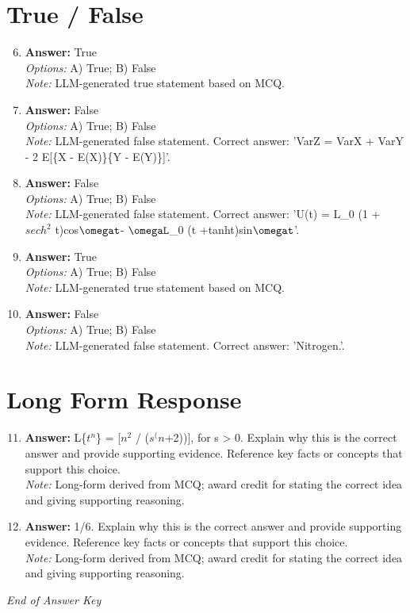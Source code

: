 \documentclass[12pt]{article}
\begin{document}
\section*{True / False}
\begin{enumerate}[label=\arabic*.]
\setcounter{enumi}{5}
\item \textbf{Answer:} True
\\ \textit{Options:} A) True; B) False
\\ \textit{Note:} LLM-generated true statement based on MCQ.
\item \textbf{Answer:} False
\\ \textit{Options:} A) True; B) False
\\ \textit{Note:} LLM-generated false statement. Correct answer: 'VarZ = VarX + VarY - 2 E[\{X - E(X)\}\{Y - E(Y)\}]'.
\item \textbf{Answer:} False
\\ \textit{Options:} A) True; B) False
\\ \textit{Note:} LLM-generated false statement. Correct answer: 'U(t) = L\_0 (1 + $sech^2$ t)cos\ensuremath{\omegat}- \ensuremath{\omegaL}\_0 (t +tanht)sin\ensuremath{\omegat}'.
\item \textbf{Answer:} True
\\ \textit{Options:} A) True; B) False
\\ \textit{Note:} LLM-generated true statement based on MCQ.
\item \textbf{Answer:} False
\\ \textit{Options:} A) True; B) False
\\ \textit{Note:} LLM-generated false statement. Correct answer: 'Nitrogen.'.
\end{enumerate}

\section*{Long Form Response}
\begin{enumerate}[label=\arabic*.]
\setcounter{enumi}{10}
\item \textbf{Answer:} L\{$t^n$\} = [$n^2$ / ($s^(n$+2))], for s \textgreater{} 0. Explain why this is the correct answer and provide supporting evidence. Reference key facts or concepts that support this choice.
\\ \textit{Note:} Long-form derived from MCQ; award credit for stating the correct idea and giving supporting reasoning.
\item \textbf{Answer:} 1/6. Explain why this is the correct answer and provide supporting evidence. Reference key facts or concepts that support this choice.
\\ \textit{Note:} Long-form derived from MCQ; award credit for stating the correct idea and giving supporting reasoning.
\end{enumerate}

\vfill
\noindent\textit{End of Answer Key}
\end{document}
